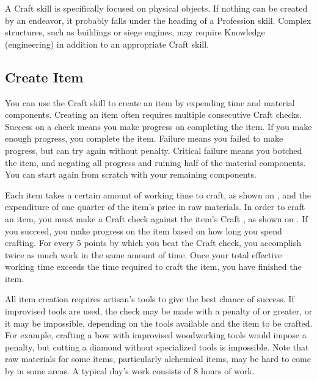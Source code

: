 
    A Craft skill is specifically focused on physical objects. If nothing can be created by an endeavor, it probably falls under the heading of a Profession skill. Complex structures, such as buildings or siege engines, may require Knowledge (engineering) in addition to an appropriate Craft skill.

    \subsection{Create Item}
        You can use the Craft skill to create an item by expending time and material components. Creating an item often requires multiple consecutive Craft checks. Success on a check means you make progress on completing the item. If you make enough progress, you complete the item. Failure means you failed to make progress, but can try again without penalty. Critical failure means you botched the item, and negating all progress and ruining half of the material components. You can start again from scratch with your remaining components.

        Each item takes a certain amount of working time to craft, as shown on , and the expenditure of one quarter of the item's price in raw materials. In order to craft an item, you must make a Craft check against the item's Craft , as shown on . If you succeed, you make progress on the item based on how long you spend crafting. For every 5 points by which you beat the Craft check, you accomplish twice as much work in the same amount of time. Once your total effective working time exceeds the time required to craft the item, you have finished the item.

        All item creation requires artisan's tools to give the best chance of success. If improvised tools are used, the check may be made with a penalty of  or greater, or it may be impossible, depending on the tools available and the item to be crafted. For example, crafting a bow with improvised woodworking tools would impose a  penalty, but cutting a diamond without specialized tools is impossible. Note that raw materials for some items, particularly alchemical items, may be hard to come by in some areas. A typical day's work consists of 8 hours of work.

